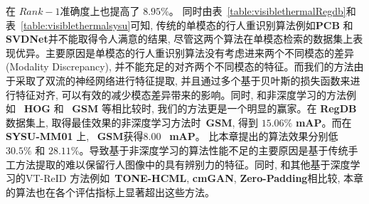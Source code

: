 在 $Rank-1$准确度上也提高了 $8.95 \%$。 同时由表~\ref{table:visiblethermalRegdb}和表~\ref{table:visiblethermalsysu}可知, 传统的单模态的行人重识别算法例如\textbf{PCB} 和 \textbf{SVDNet}并不能取得令人满意的结果, 尽管这两个算法在单模态检索的数据集上表现优异。主要原因是单模态的行人重识别算法没有考虑进来两个不同模态的差异 (Modality Discrepancy), 并不能充足的对齐两个不同模态的特征。而我们的方法由于采取了双流的神经网络进行特征提取, 并且通过多个基于贝叶斯的损失函数来进行特征对齐, 可以有效的减少模态差异带来的影响。同时, 和非深度学习的方法例如 ~\textbf{HOG} 和 ~\textbf{GSM} 等相比较时, 我们的方法更是一个明显的赢家。在 \textbf{RegDB}数据集上, 取得最佳效果的非深度学习方法时~\textbf{GSM}, 得到 $15.06 \%$ \textbf{mAP}。而在 \textbf{SYSU-MM01} 上, ~\textbf{GSM}获得$8.00$ ~\textbf{mAP}。 比本章提出的算法效果分别低 $30.5 \%$ 和 $28.11 \%$。导致基于非深度学习的算法性能不足的主要原因是基于传统手工方法提取的难以保留行人图像中的具有辨别力的特征。同时, 和其他基于深度学习的VT-ReID 方法例如~\textbf{TONE-HCML}, \textbf{cmGAN}, \textbf{Zero-Padding}相比较, 本章的算法也在各个评估指标上显著超出这些方法。

